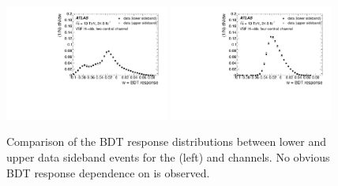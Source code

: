 \begin{figure}[htbp]
  \centering
 \includegraphics[width=0.48\textwidth]{figures/VBF/VBF_BDT_sidebands_2cen.pdf}
 \includegraphics[width=0.48\textwidth]{figures/VBF/VBF_BDT_sidebands_4cen.pdf}
\caption{Comparison of the BDT response distributions between lower and upper data sideband events for the \twocentral (left) and \fourcentral channels. No obvious BDT response dependence on \Mbb is observed. }
  \label{fig:vbf-bdtsidebands}
\end{figure}





